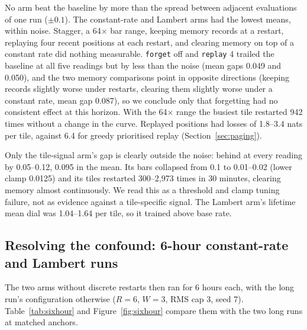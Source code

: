 \documentclass[10pt]{article}
\newcommand{\code}[1]{\texttt{#1}}
\begin{document}
No arm beat the baseline by more than the spread between adjacent evaluations of one run
($\pm0.1$). The constant-rate and Lambert arms had the lowest means, within noise. Stagger, a
64$\times$ bar range, keeping memory records at a restart, replaying four recent positions at each
restart, and clearing memory on top of a constant rate did nothing measurable. \code{forget} off and
\code{replay} 4 trailed the baseline at all five readings but by less than the noise (mean gaps 0.049
and 0.050), and the two memory comparisons point in opposite directions (keeping records slightly
worse under restarts, clearing them slightly worse under a constant rate, mean gap 0.087), so we
conclude only that forgetting had no consistent effect at this horizon. With the 64$\times$ range the
busiest tile restarted 942 times without a change in the curve. Replayed positions had losses of
1.8--3.4 nats per tile, against 6.4 for greedy prioritised replay (Section~\ref{sec:paging}).

Only the tile-signal arm's gap is clearly outside the noise: behind at every reading by 0.05--0.12,
0.095 in the mean. Its bars collapsed from 0.1 to 0.01--0.02 (lower clamp 0.0125) and its tiles
restarted 300--2,973 times in 30 minutes, clearing memory almost continuously. We read this as a
threshold and clamp tuning failure, not as evidence against a tile-specific signal. The Lambert arm's
lifetime mean dial was 1.04--1.64 per tile, so it trained above base rate.

\subsection{Resolving the confound: 6-hour constant-rate and Lambert runs}
\label{sec:confound}

The two arms without discrete restarts then ran for 6 hours each, with the long run's configuration
otherwise ($R=6$, $W=3$, RMS cap 3, seed 7). Table~\ref{tab:sixhour} and Figure~\ref{fig:sixhour}
compare them with the two long runs at matched anchors.
\end{document}
